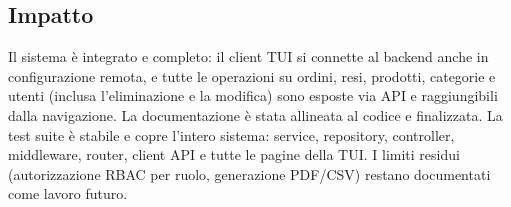 \documentclass[a4paper,12pt]{article}
\begin{document}
\subsection*{Impatto}
Il sistema \`{e} integrato e completo: il client TUI si connette al backend anche in configurazione remota, e tutte le operazioni su ordini, resi, prodotti, categorie e utenti (inclusa l'eliminazione e la modifica) sono esposte via API e raggiungibili dalla navigazione. La documentazione \`{e} stata allineata al codice e finalizzata. La test suite \`{e} stabile e copre l'intero sistema: service, repository, controller, middleware, router, client API e tutte le pagine della TUI. I limiti residui (autorizzazione RBAC per ruolo, generazione PDF/CSV) restano documentati come lavoro futuro.
\end{document}

